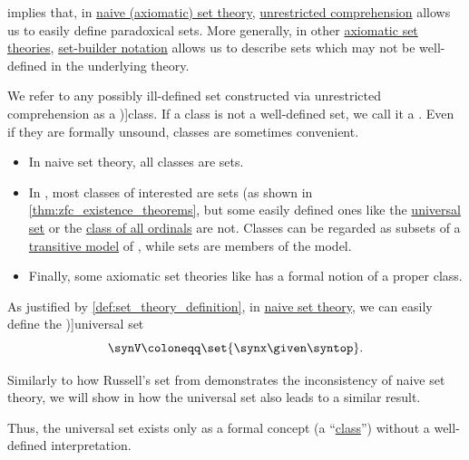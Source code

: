 \begin{concept}\label{con:set_theory_class}
   implies that, in \hyperref[def:naive_set_theory]{naive (axiomatic) set theory}, \hyperref[def:naive_set_theory/comprehension]{unrestricted comprehension} allows us to easily define paradoxical sets. More generally, in other \hyperref[def:axiomatic_set_theory]{axiomatic set theories}, \hyperref[def:set_theory_definition]{set-builder notation} allows us to describe sets which may not be well-defined in the underlying theory.

  We refer to any possibly ill-defined set constructed via unrestricted comprehension as a \term[ru=класс (\cite[24]{ШеньВерещагин2020НачалаТеорииМножеств})]{class}. If a class is not a well-defined set, we call it a . Even if they are formally unsound, classes are sometimes convenient.

  \begin{itemize}
    \item In naive set theory, all classes are sets.

    \item In \hyperref[def:zfc]{}, most classes of interested are sets (as shown in \cref{thm:zfc_existence_theorems}, but some easily defined ones like the \hyperref[def:universal_set]{universal set} or the \hyperref[def:class_of_all_ordinals]{class of all ordinals} are not. Classes can be regarded as subsets of a \hyperref[def:set_theory_model/transitive]{transitive model} of , while sets are members of the model.

    \item Finally, some axiomatic set theories like \hyperref[rem:set_theory_acronyms/nbg]{} has a formal notion of a proper class.
  \end{itemize}
\end{concept}

\begin{definition}\label{def:universal_set}\mimprovised
  As justified by \cref{def:set_theory_definition}, in \hyperref[def:naive_set_theory]{naive set theory}, we can easily define the \term[en=universal set (\cite[xvi]{Mendelson2015Logic})]{universal set}
  \begin{equation*}
    \synV \coloneqq \set{ \synx \given \syntop }.
  \end{equation*}

  Similarly to how Russell's set from  demonstrates the inconsistency of naive set theory, we will show in  how the universal set also leads to a similar result.

  Thus, the universal set exists only as a formal concept (a \enquote{\hyperref[con:set_theory_class]{class}}) without a well-defined interpretation.
\end{definition}


